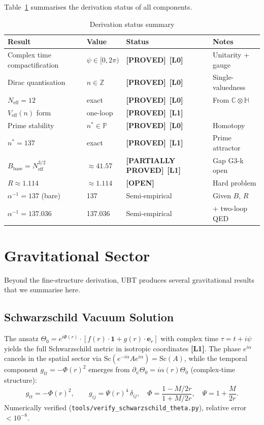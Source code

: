 \documentclass[11pt,a4paper]{article}
\theoremstyle{definition}
\theoremstyle{remark}
\newcommand{\Lzero}{\textbf{[L0]}}
\newcommand{\Lone}{\textbf{[L1]}}
\newcommand{\OPEN}{\textbf{[OPEN]}}
\newcommand{\PROVED}{\textbf{[PROVED]}}
\newcommand{\PARTIAL}{\textbf{[PARTIALLY PROVED]}}
\begin{document}
Table~\ref{tab:status} summarises the derivation status of all components.

\begin{table}[h]
\centering
\caption{Derivation status summary}
\label{tab:status}
\begin{tabular}{llll}
\toprule
Result & Value & Status & Notes \\
\midrule
Complex time compactification & $\psi \in [0,2\pi)$ & \PROVED\ \Lzero & Unitarity + gauge \\
Dirac quantisation & $n \in \mathbb{Z}$ & \PROVED\ \Lzero & Single-valuedness \\
$N_{\mathrm{eff}} = 12$ & exact & \PROVED\ \Lzero & From $\mathbb{C}\otimes\mathbb{H}$ \\
$V_{\mathrm{eff}}(n)$ form & one-loop & \PROVED\ \Lone & \\
Prime stability & $n^* \in \mathbb{P}$ & \PROVED\ \Lzero & Homotopy \\
$n^* = 137$ & exact & \PROVED\ \Lone & Prime attractor \\
$B_{\mathrm{base}} = N_{\mathrm{eff}}^{3/2}$ & $\approx 41.57$ & \PARTIAL\ \Lone & Gap G3-k open \\
$R \approx 1.114$ & $\approx 1.114$ & \OPEN & Hard problem \\
$\alpha^{-1} = 137$ (bare) & 137 & Semi-empirical & Given $B$, $R$ \\
$\alpha^{-1} = 137.036$ & 137.036 & Semi-empirical & + two-loop QED \\
\bottomrule
\end{tabular}
\end{table}


\section{Gravitational Sector}
\label{sec:gravity}

Beyond the fine-structure derivation, UBT produces several gravitational
results that we summarise here.

\subsection{Schwarzschild Vacuum Solution}

The ansatz $\Theta_0 = e^{i\Phi(r)}\cdot[f(r)\cdot\mathbf{1}
+ g(r)\cdot\boldsymbol{e}_r]$ with complex time $\tau = t + i\psi$
yields the full Schwarzschild metric in isotropic coordinates \Lone.
The phase $e^{i\alpha}$ cancels in the spatial sector via
$\mathrm{Sc}(e^{-i\alpha}Ae^{i\alpha}) = \mathrm{Sc}(A)$, while the
temporal component $g_{tt} = -\Phi(r)^2$ emerges from
$\partial_\psi\Theta_0 = i\alpha(r)\Theta_0$ (complex-time structure):
\[
  g_{tt} = -\Phi(r)^2,\qquad g_{ij} = \Psi(r)^4\,\delta_{ij},
  \quad \Phi = \frac{1-M/2r}{1+M/2r},\quad \Psi = 1+\frac{M}{2r}.
\]
Numerically verified (\texttt{tools/verify\_schwarzschild\_theta.py}),
relative error $< 10^{-8}$.
\end{document}
